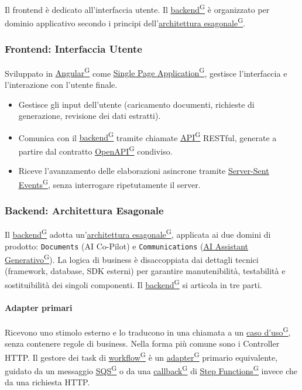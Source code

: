 \documentclass[a4paper,12pt]{article}
\providecommand{\glslink}[2]{\href{https://alittlebyte-19.github.io/Documentazione/glossario.html\#gls-#1}{\underline{#2}\textsuperscript{\scriptsize G}}}
\begin{document}
Il frontend è dedicato all'interfaccia utente. Il \glslink{backend}{backend} è organizzato per dominio applicativo secondo i principi dell'\glslink{architettura-esagonale}{architettura esagonale}.

\subsubsection{Frontend: Interfaccia Utente}

Sviluppato in \glslink{angular}{Angular} come \glslink{spa-single-page-application}{Single Page Application}, gestisce l'interfaccia e l'interazione con l'utente finale.

\begin{itemize}
    \item Gestisce gli input dell'utente (caricamento documenti, richieste di generazione, revisione dei dati estratti).
    \item Comunica con il \glslink{backend}{backend} tramite chiamate \glslink{api-application-programming-interface}{API} RESTful, generate a partire dal contratto \glslink{openapi}{OpenAPI} condiviso.
    \item Riceve l'avanzamento delle elaborazioni asincrone tramite \glslink{sse-server-sent-events}{Server-Sent Events}, senza interrogare ripetutamente il server.
\end{itemize}

\subsubsection{Backend: Architettura Esagonale}

Il \glslink{backend}{backend} adotta un'\glslink{architettura-esagonale}{architettura esagonale}, applicata ai due domini di prodotto: \texttt{Documents} (AI Co-Pilot) e \texttt{Communications} (\glslink{ai-assistant-generativo}{AI Assistant Generativo}). La logica di business è disaccoppiata dai dettagli tecnici (framework, database, SDK esterni) per garantire manutenibilità, testabilità e sostituibilità dei singoli componenti. Il \glslink{backend}{backend} si articola in tre parti.

\paragraph{Adapter primari}
Ricevono uno stimolo esterno e lo traducono in una chiamata a un \glslink{caso-d-uso-uc}{caso d'uso}, senza contenere regole di business. Nella forma più comune sono i Controller HTTP. Il gestore dei task di \glslink{workflow}{workflow} è un \glslink{adapter}{adapter} primario equivalente, guidato da un messaggio \glslink{sqs-simple-queue-service}{SQS} o da una \glslink{callback}{callback} di \glslink{step-functions}{Step Functions} invece che da una richiesta HTTP.
\end{document}
